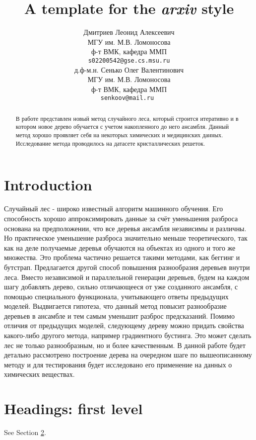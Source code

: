 \documentclass{article}
\title{A template for the \emph{arxiv} style}
\author{ Дмитриев Леонид Алексеевич  \\
	МГУ им. М.В. Ломоносова\\
	ф-т ВМК, кафедра ММП\\
	\texttt{s02200542@gse.cs.msu.ru} \\
	\And
	д.ф-м.н. Сенько Олег Валентинович \\
	МГУ им. М.В. Ломоносова\\
	ф-т ВМК, кафедра ММП\\
	\texttt{senkoov@mail.ru } \\
}
\date{}
\begin{document}
\maketitle

\begin{abstract}
	В работе представлен новый метод случайного леса, который строится итеративно и в котором новое дерево обучается с учетом накопленного до него ансамбля. Данный метод хорошо проявляет себя на некоторых химических и медицинских данных. Исследование метода проводилось на датасете кристаллических решеток.
\end{abstract}



\section{Introduction}

Случайный лес - широко известный алгоритм машинного обучения.
Его способность хорошо аппроксимировать данные за счёт
уменьшения разброса основана на предположении, что все деревья
ансамбля независимы и различны. Но практическое уменьшение
разброса значительно меньше теоретического, так как на деле
получаемые деревья обучаются на объектах из одного и того же
множества. Это проблема частично решается такими методами, как
беггинг и бутстрап.
Предлагается другой способ повышения разнообразия деревьев
внутри леса. Вместо независимой и параллельной генерации деревьев,
будем на каждом шагу добавлять дерево, сильно отличающееся от уже
созданного ансамбля, с помощью специального функционала,
учитывающего ответы предыдущих моделей. Выдвигается гипотеза,
что данный метод повысит разнообразие деревьев в ансамбле и тем
самым уменьшит разброс предсказаний.
Помимо отличия от предыдущих моделей, следующему дереву можно
придать свойства какого-либо другого метода, например градиентного
бустинга. Это может сделать лес не только разнообразным, но и более
качественным.
В данной работе будет детально рассмотрено построение дерева на
очередном шаге по вышеописанному методу и для тестирования будет
исследовано его применение на данных о химических веществах.

\section{Headings: first level}
\label{sec:headings}

\lipsum[4] See Section \ref{sec:headings}.
\end{document}
